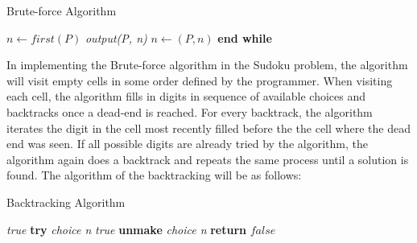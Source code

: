 \documentclass[a4paper,oneside,11pt]{report}
\renewcommand\algorithmicdo{}
\begin{document}
\begin{algorithm}
\caption{Brute-force Algorithm}\label{bruteforce}
\begin{algorithmic}[1]
\State $n\gets first(P)$
\textit{output(P, n)}
\EndIf
\State $n\gets (P, n)$
\EndWhile\label{bruteforceendwhile}
\State \textbf{end while}
\end{algorithmic}
\end{algorithm}

In implementing  the Brute-force algorithm in the Sudoku problem, the algorithm will visit empty cells in some order defined by the programmer. When visiting each cell, the algorithm fills in digits in sequence of available choices and backtracks once a dead-end is reached. For every backtrack, the algorithm iterates the digit in the cell most recently filled before the the cell where the dead end was seen. If all possible digits are already tried by the algorithm, the algorithm again does a backtrack and repeats the same process until a solution is found. The algorithm of the backtracking will be as follows:\\

\begin{algorithm}
\caption{Backtracking Algorithm}\label{backtracking}
\begin{algorithmic}[1]
\newcommand\NoDo{\renewcommand\algorithmicdo{}}
\textit{true}
\EndIf
{}
\State \textbf{try} \textit{choice n}
 \textit{true}
\EndIf
\State \textbf{unmake} \textit{choice n}
\EndFor
\State \textbf{return} $false$
\end{algorithmic}
\end{algorithm}

\begin{figure}[h]
  \centering
\end{figure}
\end{document}
